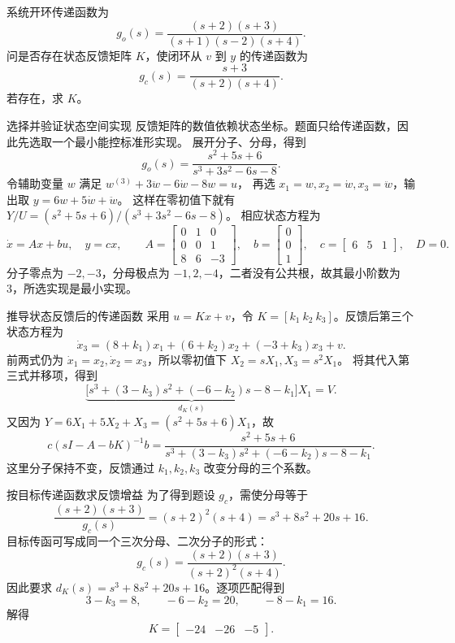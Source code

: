 \documentclass[11pt]{article}
\begin{document}
\begin{problem}[原题 12]
系统开环传递函数为
\[
g_o(s)=\frac{(s+2)(s+3)}{(s+1)(s-2)(s+4)}.
\]
问是否存在状态反馈矩阵 $K$，使闭环从 $v$ 到 $y$ 的传递函数为
\[
g_c(s)=\frac{s+3}{(s+2)(s+4)}.
\]
若存在，求 $K$。
\end{problem}
\begin{solution}
\begin{proofstep}{选择并验证状态空间实现}
反馈矩阵的数值依赖状态坐标。题面只给传递函数，因此先选取一个最小能控标准形实现。
展开分子、分母，得到
\[
g_o(s)=\frac{s^2+5s+6}{s^3+3s^2-6s-8}.
\]
令辅助变量 $w$ 满足 $w^{(3)}+3\ddot w-6\dot w-8w=u$，
再选 $x_1=w,x_2=\dot w,x_3=\ddot w$，输出取 $y=6w+5\dot w+\ddot w$。
这样在零初值下就有 $Y/U=(s^2+5s+6)/(s^3+3s^2-6s-8)$。
相应状态方程为
\[
\dot x=Ax+bu,\quad y=cx,\qquad
A=\begin{bmatrix}0&1&0\\0&0&1\\8&6&-3\end{bmatrix},\quad
b=\begin{bmatrix}0\\0\\1\end{bmatrix},\quad c=\begin{bmatrix}6&5&1\end{bmatrix},\quad D=0.
\]
分子零点为 $-2,-3$，分母极点为 $-1,2,-4$，二者没有公共根，故其最小阶数为 3，所选实现是最小实现。
\end{proofstep}

\begin{proofstep}{推导状态反馈后的传递函数}
采用 $u=Kx+v$，令 $K=[k_1\ k_2\ k_3]$。反馈后第三个状态方程为
\[
\dot x_3=(8+k_1)x_1+(6+k_2)x_2+(-3+k_3)x_3+v.
\]
前两式仍为 $\dot x_1=x_2,\dot x_2=x_3$，所以零初值下 $X_2=sX_1,X_3=s^2X_1$。
将其代入第三式并移项，得到
\[
\underbrace{\bigl[s^3+(3-k_3)s^2+(-6-k_2)s-8-k_1\bigr]}_{d_K(s)}X_1=V.
\]
又因为 $Y=6X_1+5X_2+X_3=(s^2+5s+6)X_1$，故
\[
c(sI-A-bK)^{-1}b
=\frac{s^2+5s+6}{s^3+(3-k_3)s^2+(-6-k_2)s-8-k_1}.
\]
这里分子保持不变，反馈通过 $k_1,k_2,k_3$ 改变分母的三个系数。
\end{proofstep}

\begin{proofstep}{按目标传递函数求反馈增益}
为了得到题设 $g_c$，需使分母等于
\[
\frac{(s+2)(s+3)}{g_c(s)}=(s+2)^2(s+4)
=s^3+8s^2+20s+16.
\]
目标传函可写成同一个三次分母、二次分子的形式：
\[
g_c(s)=\frac{(s+2)(s+3)}{(s+2)^2(s+4)}.
\]
因此要求 $d_K(s)=s^3+8s^2+20s+16$。逐项匹配得到
\[
3-k_3=8,\qquad -6-k_2=20,\qquad -8-k_1=16.
\]
解得
\[
\boxed{K=\begin{bmatrix}-24&-26&-5\end{bmatrix}.}
\]
\end{proofstep}


\end{solution}
\end{document}
